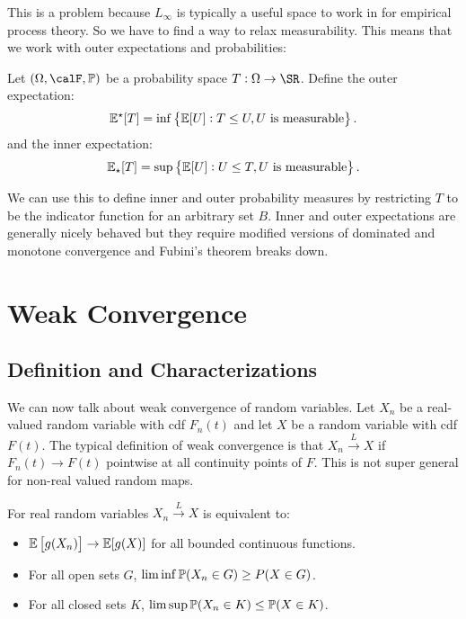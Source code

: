 This is a problem because \(L_\infty\) is typically a useful space to work in for empirical process theory. So we have to find a way to relax measurability. This means that we work with outer expectations and probabilities:
\begin{definition}
	Let \((\Omega,\calF,\P)\) be a probability space \(T:\Omega \to \SR\). Define the outer expectation:
	 \[
		 \E^\star[T] = \inf\left\{\E[U]: T\leq U, U\text{ is measurable}\right\}
	.\]
	and the inner expectation:
	\[
		\E_\star[T] = \sup\left\{\E[U]: U\leq T, U\text{ is measurable}\right\}
	.\] 
\end{definition}
We can use this to define inner and outer probability measures by restricting \(T\) to be the indicator function for an arbitrary set  \(B\). Inner and outer expectations are generally nicely behaved but they require modified versions of dominated and monotone convergence and Fubini's theorem breaks down.

\section{Weak Convergence}%
\label{sec:weak-convergence}

\subsection{Definition and Characterizations}%
\label{subsec:wcov-def}

We can now talk about weak convergence of random variables. Let \(X_n\) be a real-valued random variable with cdf  \(F_n(t)\) and let  \(X\) be a random variable with cdf  \(F(t)\). The typical definition of weak convergence is that \(X_n \overset{L}{\to} X\) if  \(F_n(t) \to F(t)\) pointwise at all continuity points of  \(F\). This is not super general for non-real valued random maps.

\begin{theorem}[Portmanteau]
	\label{thm:portmanteau}
	For real random variables \(X_n\overset{L}{\to}X\) is equivalent to:
	 \begin{itemize}
		 \item \(\E\left[g(X_n)\right] \to \E[g(X)]\) for all bounded continuous functions. 
		 \item For all open sets \(G\),  \(\lim\inf \P(X_n\in G) \geq P(X\in G)\).
		 \item For all closed sets \(K\),  \(\lim\sup \P(X_n \in K) \leq \P(X \in K)\).
	\end{itemize}
\end{theorem}

